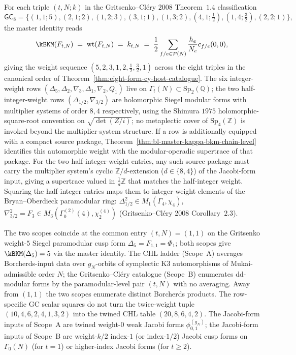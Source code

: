 \begin{corollary}
\label{cor:master-gc-8form-chapter}
For each triple $(t, N; k)$ in the Gritsenko--Cl\'ery $2008$
Theorem~$1.4$ classification
\[
 \mathsf{GC}_8 = \bigl\{(1, 1; 5), (2, 1; 2), (1, 2; 3), (3, 1; 1),
 (1, 3; 2), (4, 1; \tfrac{1}{2}), (1, 4; \tfrac{3}{2}), (2, 2; 1)\bigr\},
\]
the master identity reads
\[
\kBKM(F_{t, N}) \;=\; \mathrm{wt}(F_{t, N}) \;=\; k_{t, N}
 \;=\; \frac{1}{2} \sum_{f/e \in \mathcal{P}(N)} \frac{h_e}{N_e}
 c_{f/e}(0, 0),
\]
giving the weight sequence $(5, 2, 3, 1, 2, \tfrac{1}{2}, \tfrac{3}{2},
1)$ across the eight triples in the canonical order of
Theorem~\ref{thm:eight-form-cy-host-catalogue}. The six integer-weight
rows $(\Delta_5, \Delta_2, \nabla_3, \Delta_1, \nabla_2, Q_1)$ live on
$\Gamma_t(N) \subset \mathrm{Sp}_2(\mathbb{Q})$; the two half-integer-weight
rows $(\Delta_{1/2}, \nabla_{3/2})$ are holomorphic Siegel modular forms
with multiplier systems of order $8, 4$ respectively, using the Shimura
$1975$ holomorphic-square-root convention on $\sqrt{\det(Z/i)}$; no
metaplectic cover of $\mathrm{Sp}_4(\mathbb{Z})$ is invoked beyond the
multiplier-system structure. If a row is additionally equipped with a
compact source package, Theorem~\ref{thm:bl-master-kappa-bkm-chain-level}
identifies this automorphic weight with the modular-operadic supertrace
of that package. For the two half-integer-weight entries, any such
source package must carry the multiplier system's cyclic
$\mathbb{Z}/d$-extension ($d \in \{8, 4\}$) of the Jacobi-form input,
giving a supertrace valued in $\tfrac{1}{d}\mathbb{Z}$ that matches the
half-integer weight. Squaring the half-integer entries maps them to
integer-weight elements of the
Bryan--Oberdieck paramodular ring:
$\Delta_{1/2}^2 \in M_1(\Gamma_4, \chi_4)$, $\nabla_{3/2}^2 = F_3
\in M_3(\Gamma_0^{(2)}(4), \chi_2^{(4)})$
(Gritsenko--Cl\'ery 2008 Corollary~$2.3$).
\end{corollary}

\begin{remark}[Coincidence at the common entry $(t, N) = (1, 1)$]
\label{rem:n1-coincidence-chapter}
The two scopes coincide at the common entry $(t, N) = (1, 1)$ on the
Gritsenko weight-$5$ Siegel paramodular cusp form $\Delta_5 = F_{1, 1}
= \Phi_1$; both scopes give $\kBKM(\Delta_5) = 5$ via the master identity. The
CHL ladder (Scope~A) averages Borcherds-input data over $g_N$-orbits
of symplectic K3 automorphisms of Mukai-admissible order $N$; the
Gritsenko--Cl\'ery catalogue (Scope~B) enumerates dd-modular forms
by the paramodular-level pair $(t, N)$ with no averaging. Away from
$(1,1)$ the two scopes enumerate distinct Borcherds products. The
row-specific GC scalar squares do not turn the twice-weight tuple
$(10,4,6,2,4,1,3,2)$ into the twined CHL table $(20,8,6,4,2)$. The Jacobi-form
inputs of Scope~A are twined weight-$0$
weak Jacobi forms $\phi_{0, 1}^{(g_N)}$; the Jacobi-form inputs of
Scope~B are weight-$k/2$ index-$1$ (or index-$1/2$) Jacobi cusp forms
on $\Gamma_0(N)$ (for $t = 1$) or higher-index Jacobi forms
(for $t \geq 2$).
\end{remark}

